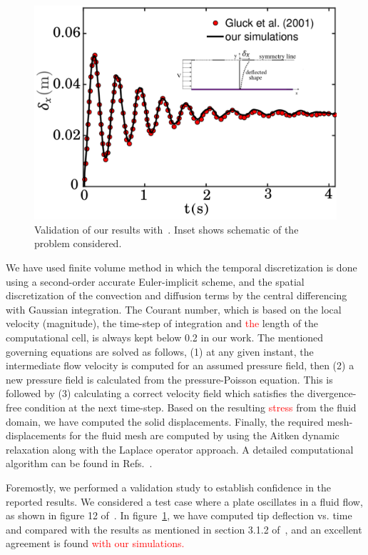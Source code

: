 \documentclass[aps,pre,twocolumn,aps,longbibliography]{revtex4-1}
\begin{document}
				\begin{figure}
					\begin{minipage}[c]{1\linewidth}
						\includegraphics[width=1\linewidth]{Fig02.pdf} 
					\end{minipage} 
					\caption{Validation of our results with~\cite{Gluck2001}. Inset shows schematic of the problem considered.}
					\label{validation1}
				\end{figure}
	
	We have used finite volume method in which the temporal discretization is done using a second-order accurate Euler-implicit scheme, and the spatial discretization of the convection and diffusion terms by the central differencing with Gaussian integration. The Courant number, which is based on the local velocity (magnitude), the time-step of integration and \textcolor{red}{the} length of the computational cell, is always kept below 0.2 in our work. The mentioned governing equations are solved as follows, (1) at any given instant, the intermediate flow velocity is computed for an assumed pressure field, then (2) a new pressure field is calculated from the pressure-Poisson equation. This is followed by (3) calculating a correct velocity field which satisfies the divergence-free condition at the next time-step. Based on the resulting \textcolor{red}{stress} from the fluid domain, we have computed the solid displacements. Finally, the required mesh-displacements for the fluid mesh are computed by using the Aitken dynamic relaxation along with the Laplace operator approach. A detailed computational algorithm can be found in Refs.~\cite{Hrvoje2007, CampbellPaterson2011}.
	
	Foremostly, we performed a validation study to establish confidence in the reported results. We considered a test case where a plate oscillates in a fluid flow, as shown in figure 12 of~\cite{Gluck2001}. In figure~\ref{validation1}, we have computed tip deflection vs. time and compared with the results as mentioned in section 3.1.2 of~\cite{Gluck2001}, and an excellent agreement is found \textcolor{red}{with our simulations.}
	
\end{document}
